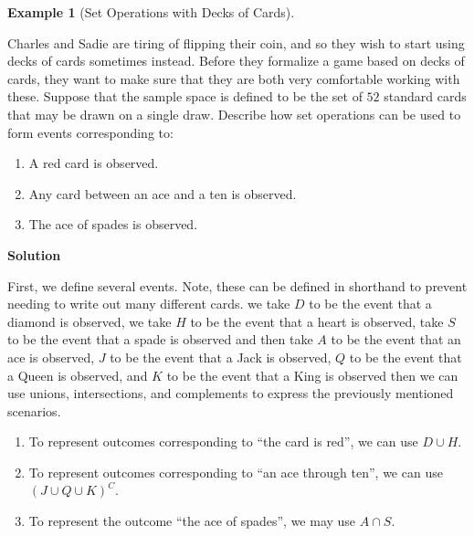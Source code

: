 \documentclass[
  letterpaper,
  DIV=11,
  numbers=noendperiod]{scrreprt}
\providecommand{\tightlist}{%
  \setlength{\itemsep}{0pt}\setlength{\parskip}{0pt}}\usepackage{longtable,booktabs,array}
\theoremstyle{definition}
\theoremstyle{definition}
\newtheorem{example}{Example}[chapter]
\theoremstyle{definition}
\theoremstyle{remark}
\begin{document}
\begin{example}[Set Operations with Decks of
Cards]\protect\hypertarget{exm-card-set-operations}{}\label{exm-card-set-operations}

Charles and Sadie are tiring of flipping their coin, and so they wish to
start using decks of cards sometimes instead. Before they formalize a
game based on decks of cards, they want to make sure that they are both
very comfortable working with these. Suppose that the sample space is
defined to be the set of \(52\) standard cards that may be drawn on a
single draw. Describe how set operations can be used to form events
corresponding to:

\begin{enumerate}
\def\labelenumi{\alph{enumi}.}
\tightlist
\item
  A red card is observed.
\item
  Any card between an ace and a ten is observed.
\item
  The ace of spades is observed.
\end{enumerate}

\begin{tcolorbox}[enhanced jigsaw, colback=white, colframe=quarto-callout-color-frame, arc=.35mm, leftrule=.75mm, rightrule=.15mm, opacityback=0, breakable, bottomrule=.15mm, left=2mm, toprule=.15mm]

\vspace{-3mm}\textbf{Solution}\vspace{3mm}

First, we define several events. Note, these can be defined in shorthand
to prevent needing to write out many different cards. we take \(D\) to
be the event that a diamond is observed, we take \(H\) to be the event
that a heart is observed, take \(S\) to be the event that a spade is
observed\footnotemark{} and then take \(A\) to be the event that an ace
is observed, \(J\) to be the event that a Jack is observed, \(Q\) to be
the event that a Queen is observed, and \(K\) to be the event that a
King is observed\footnotemark{} then we can use unions, intersections,
and complements to express the previously mentioned scenarios.

\begin{enumerate}
\def\labelenumi{\alph{enumi}.}
\tightlist
\item
  To represent outcomes corresponding to ``the card is red'', we can use
  \(D \cup H\).
\item
  To represent outcomes corresponding to ``an ace through ten'', we can
  use \((J \cup Q \cup K)^C\).
\item
  To represent the outcome ``the ace of spades'', we may use
  \(A \cap S\).
\end{enumerate}

\end{tcolorbox}



\end{example}
\end{document}
